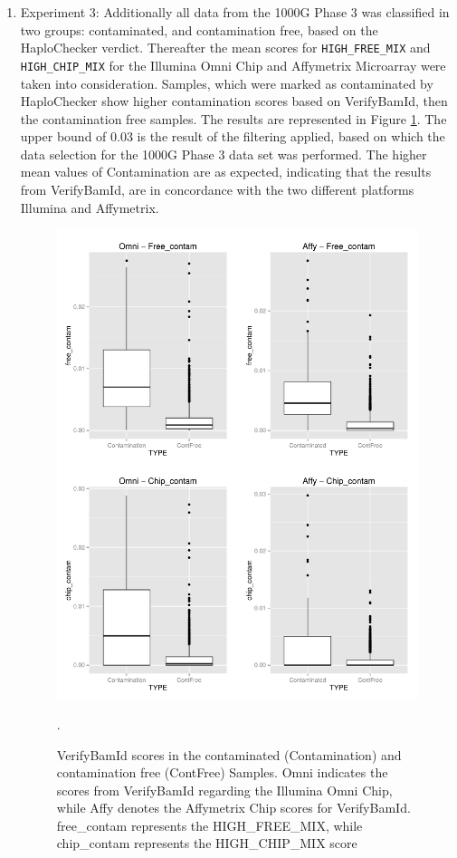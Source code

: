 \begin{enumerate}
\item Experiment 3: Additionally all data from the 1000G Phase 3 was classified in two groups: contaminated, and contamination free, based on the HaploChecker verdict. Thereafter the mean scores for  \verb|HIGH_FREE_MIX| and \verb|HIGH_CHIP_MIX| for the Illumina Omni Chip and Affymetrix Microarray were taken into consideration. Samples, which were marked as contaminated by HaploChecker show higher contamination scores based on VerifyBamId, then the contamination free samples. The results are represented in Figure \ref{contScores}. The upper bound of 0.03 is the result of the filtering applied, based on which the data selection for the 1000G Phase 3 data set was performed. The higher mean values of Contamination are as expected, indicating that the results from VerifyBamId, are in concordance with the two different platforms Illumina and Affymetrix.
\begin{figure}[!ht]
    \centering
    \includegraphics[width=1\textwidth]{images/Result-VerifyBamId-check.pdf}
    \caption[VerifyBamId scores in the contaminated (Contamination) and contamination free (ContFree) Samples]{VerifyBamId scores in the contaminated (Contamination) and contamination free (ContFree) Samples. Omni indicates the scores from VerifyBamId regarding the Illumina Omni Chip, while Affy denotes the Affymetrix Chip scores for VerifyBamId. free\_contam represents the HIGH\_FREE\_MIX, while chip\_contam represents the HIGH\_CHIP\_MIX score}.  
    \label{contScores}
\end{figure}
\end{enumerate}

